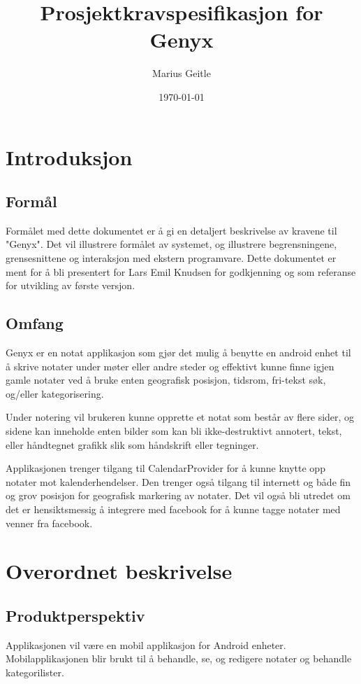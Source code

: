 \documentclass[a4paper, 12pt]{article}
\begin{document}
\title{Prosjektkravspesifikasjon for Genyx}
\author{Marius Geitle}
\date{\today}

\maketitle
\tableofcontents
\listoffigures

\section{Introduksjon}
\subsection{Formål}
Formålet med dette dokumentet er å gi en detaljert beskrivelse av kravene til
"Genyx". Det vil illustrere formålet av systemet, og illustrere begrensningene,
grensesnittene og interaksjon med ekstern programvare. Dette dokumentet er ment for å
bli presentert for Lars Emil Knudsen for godkjenning og som referanse for utvikling
av første versjon.


\subsection{Omfang}
Genyx er en notat applikasjon som gjør det mulig å benytte en android enhet til å
skrive notater under møter eller andre steder og effektivt kunne finne igjen gamle
notater ved å bruke enten geografisk posisjon, tidsrom, fri-tekst søk, og/eller
kategorisering.

Under notering vil brukeren kunne opprette et notat som består av flere sider, og sidene kan inneholde enten bilder som kan bli ikke-destruktivt annotert, tekst, eller håndtegnet grafikk slik som håndskrift eller tegninger.

Applikasjonen trenger tilgang til CalendarProvider for å kunne knytte opp notater mot kalenderhendelser. Den trenger også tilgang til internett og både fin og grov posisjon for geografisk markering av notater. Det vil også bli utredet om det er hensiktsmessig å integrere med facebook for å kunne tagge notater med venner fra facebook.

\section{Overordnet beskrivelse}
\subsection{Produktperspektiv}
Applikasjonen vil være en mobil applikasjon for Android enheter. Mobilapplikasjonen blir brukt til å behandle, se, og redigere notater og behandle kategorilister.
\end{document}
